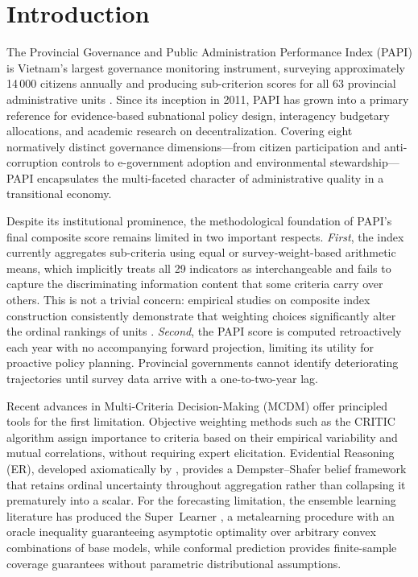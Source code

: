 \documentclass[12pt, a4paper]{article}
\begin{document}
\section{Introduction}

The Provincial Governance and Public Administration Performance Index (PAPI) is
Vietnam's largest governance monitoring instrument, surveying approximately
14\,000 citizens annually and producing sub-criterion scores for all 63 provincial
administrative units \citep{CECODES2023}. Since its inception in 2011, PAPI has
grown into a primary reference for evidence-based subnational policy design,
interagency budgetary allocations, and academic research on decentralization.
Covering eight normatively distinct governance dimensions---from citizen
participation and anti-corruption controls to e-government adoption and
environmental stewardship---PAPI encapsulates the multi-faceted character of
administrative quality in a transitional economy.

Despite its institutional prominence, the methodological foundation of PAPI's
final composite score remains limited in two important respects. \emph{First},
the index currently aggregates sub-criteria using equal or survey-weight-based
arithmetic means, which implicitly treats all 29 indicators as
interchangeable and fails to capture the discriminating information content that
some criteria carry over others. This is not a trivial concern: empirical studies
on composite index construction consistently demonstrate that weighting choices
significantly alter the ordinal rankings of units
\citep{Saltelli2008,Nardo2005}. \emph{Second}, the PAPI score is computed
retroactively each year with no accompanying forward projection, limiting its
utility for proactive policy planning. Provincial governments cannot identify
deteriorating trajectories until survey data arrive with a one-to-two-year lag.

Recent advances in Multi-Criteria Decision-Making (MCDM) offer principled tools
for the first limitation. Objective weighting methods such as the CRITIC algorithm
\citep{Diakoulaki1995} assign importance to criteria based on their empirical
variability and mutual correlations, without requiring expert elicitation.
Evidential Reasoning (ER), developed axiomatically by \citet{YangXu2002},
provides a Dempster--Shafer belief framework that retains ordinal uncertainty
throughout aggregation rather than collapsing it prematurely into a scalar.
For the forecasting limitation, the ensemble learning literature has produced
the Super~Learner \citep{vanderLaan2007}, a metalearning procedure with an
oracle inequality guaranteeing asymptotic optimality over arbitrary convex
combinations of base models, while conformal prediction \citep{Vovk2005,Barber2023}
provides finite-sample coverage guarantees without parametric distributional
assumptions.
\end{document}
